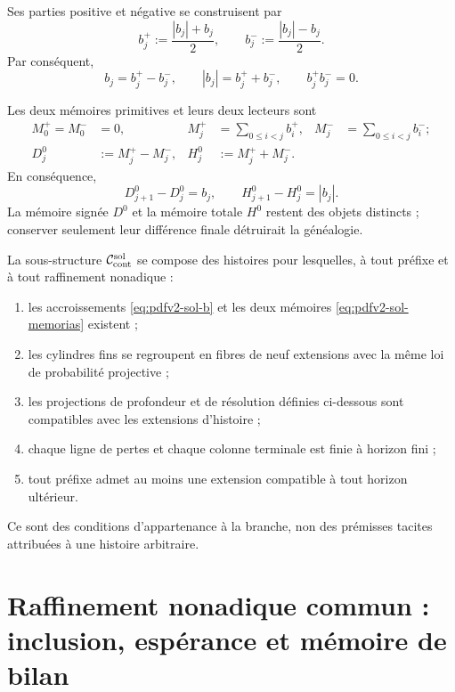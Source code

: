 Ses parties positive et négative se construisent par
\begin{equation}\label{eq:pdfv2-sol-bpm}
 b_j^+:=\frac{|b_j|+b_j}{2},
 \qquad
 b_j^-:=\frac{|b_j|-b_j}{2}.
\end{equation}
Par conséquent,
\begin{equation}\label{eq:pdfv2-sol-bpm-identidades}
 b_j=b_j^+-b_j^-,
 \qquad
 |b_j|=b_j^++b_j^-,
 \qquad
 b_j^+b_j^-=0.
\end{equation}

Les deux mémoires primitives et leurs deux lecteurs sont
\begin{align}
 M_0^+=M_0^-&=0,
 &M_j^+&=\sum_{0\leq i<j}b_i^+,
 &M_j^-&=\sum_{0\leq i<j}b_i^-;
 \label{eq:pdfv2-sol-memorias}\\
 D_j^0&:=M_j^+-M_j^-,
 &H_j^0&:=M_j^++M_j^-.
 \label{eq:pdfv2-sol-dh}
\end{align}
En conséquence,
\begin{equation}\label{eq:pdfv2-sol-dh-diferencias}
 D_{j+1}^0-D_j^0=b_j,
 \qquad
 H_{j+1}^0-H_j^0=|b_j|.
\end{equation}
La mémoire signée \(D^0\) et la mémoire totale \(H^0\) restent des
objets distincts ; conserver seulement leur différence finale détruirait la
généalogie.

La sous-structure \(\mathcal C_{\rm cont}^{\rm sol}\) se compose des histoires
pour lesquelles, à tout préfixe et à tout raffinement nonadique :
\begin{enumerate}
 \item les accroissements \eqref{eq:pdfv2-sol-b} et les deux mémoires
       \eqref{eq:pdfv2-sol-memorias} existent ;
 \item les cylindres fins se regroupent en fibres de neuf extensions avec la
       même loi de probabilité projective ;
 \item les projections de profondeur et de résolution définies ci-dessous sont
       compatibles avec les extensions d'histoire ;
 \item chaque ligne de pertes et chaque colonne terminale est finie à horizon
       fini ;
 \item tout préfixe admet au moins une extension compatible à tout
       horizon ultérieur.
\end{enumerate}
Ce sont des conditions d'appartenance à la branche, non des prémisses tacites
attribuées à une histoire arbitraire.

\fi
\section{Raffinement nonadique commun : inclusion, espérance et mémoire de bilan}
\label{sec:pdfv2-sol-e9j9}

